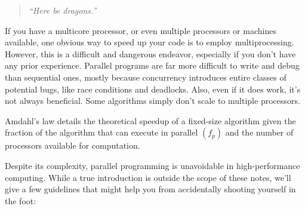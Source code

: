 \label{chap:Parallel computing}

\begin{quote}\small
  \emph{``Here be dragons.''}
\end{quote}

If you have a multicore processor, or even multiple processors or machines available, one obvious way to speed up your code is to employ multiprocessing.
However, this is a difficult and dangerous endeavor, especially if you don't have any prior experience.
Parallel programs are far more difficult to write and debug than sequential ones, mostly because concurrency introduces entire classes of potential bugs, like race conditions and deadlocks.
Also, even if it does work, it's not always beneficial.
Some algorithms simply don't scale to multiple processors.
\begin{marginfigure}
  \caption{Amdahl's law details the theoretical speedup of a fixed-size algorithm given the fraction of the algorithm that can execute in parallel $(f_p)$ and the number of processors available for computation.}
\end{marginfigure}
Despite its complexity, parallel programming is unavoidable in high-performance computing.
While a true introduction is outside the scope of these notes, we'll give a few guidelines that might help you from accidentally shooting yourself in the foot:
